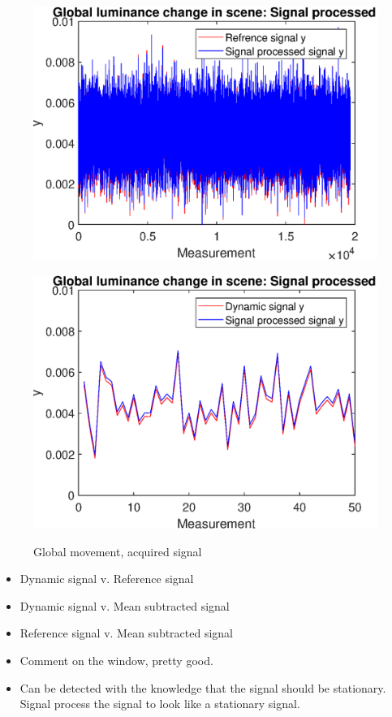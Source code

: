 \begin{figure}[H]
\begin{minipage}[t]{0.495\textwidth}
    \includegraphics[width=1\textwidth]{result/dynamic/lum/intense_change_sp_ref.eps}
    \label{fig:lum_sig_3}
\end{minipage}
\begin{minipage}[t]{0.495\textwidth}
    \includegraphics[width = \textwidth]{result/dynamic/lum/intense_change_sp_ref_win.eps}
    \label{fig:lum_sig_4}
\end{minipage}
    \caption{Global movement, acquired signal}
    \label{fig:lum_sig}
\end{figure}

\begin{itemize}
    \item Dynamic signal v. Reference signal
    \item Dynamic signal v. Mean subtracted signal
    \item Reference signal v. Mean subtracted signal
    \item Comment on the window, pretty good.
    \item Can be detected with the knowledge that the signal should be stationary. Signal process the signal to look like a stationary signal.
\end{itemize}